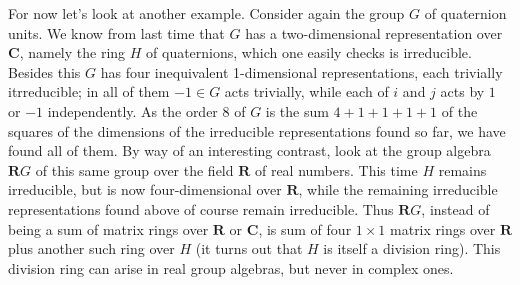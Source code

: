 \documentclass[10pt]{article}
\begin{document}
For now let's look at another example. Consider again the group $G$ of
quaternion units. We know from last time that $G$ has a two-dimensional
representation over $\mathbf C$, namely the ring $H$ of quaternions,
which one easily checks is irreducible. Besides this $G$ has four
inequivalent 1-dimensional representations, each trivially itrreducible;
in all of them $-1\in G$ acts trivially, while each of $i$ and $j$ acts
by $1$ or $-1$ independently. As the order 8 of $G$ is the sum
$4+1+1+1+1$ of the squares of the dimensions of the irreducible
representations found so far, we have found all of them. By way of an
interesting contrast, look at the group algebra $\mathbf RG$ of this
same group over the field $\mathbf R$ of real numbers. This time $H$
remains irreducible, but is now four-dimensional over $\mathbf R$, while
the remaining irreducible representations found above of course remain
irreducible. Thus $\mathbf RG$, instead of being a sum of matrix rings
over $\mathbf R$ or $\mathbf C$, is sum of four $1\times 1$ matrix rings
over $\mathbf R$ plus another such ring over $H$ (it turns out that $H$
is itself a division ring). This division ring can arise in real group
algebras, but never in complex ones.
\end{document}
